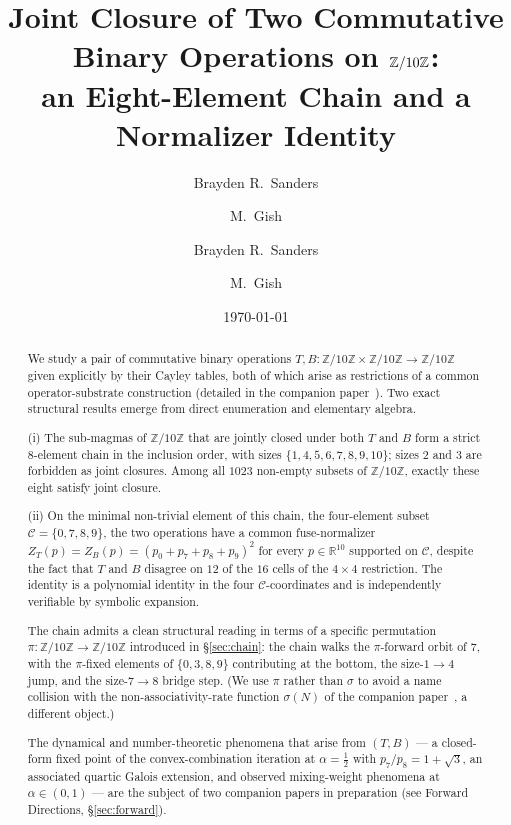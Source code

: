 \documentclass[11pt,reqno]{amsart}
\title[Joint closure on $\Zten$]{Joint Closure of Two Commutative Binary
Operations on $\Zten$:\\ an Eight-Element Chain and a Normalizer Identity}
\author{Brayden R.\ Sanders \and M.\ Gish}
\author{Brayden R.\ Sanders \and M.\ Gish}
\date{\today}
\theoremstyle{plain}
\theoremstyle{definition}
\theoremstyle{remark}
\newcommand{\Z}{\mathbb{Z}}
\newcommand{\R}{\mathbb{R}}
\newcommand{\Zten}{\Z/10\Z}
\newcommand{\Cfour}{\mathcal{C}}
\begin{document}
\begin{abstract}
We study a pair of commutative binary operations
$T,B:\Zten\times\Zten\to\Zten$ given explicitly by their Cayley
tables, both of which arise as restrictions of a common
operator-substrate construction (detailed in the companion
paper~\cite{SandersGish2026Sigma}). Two exact structural results
emerge from direct enumeration and elementary algebra.

(i) The sub-magmas of $\Zten$ that are jointly closed under
both $T$ and $B$ form a strict $8$-element chain in the inclusion
order, with sizes $\{1, 4, 5, 6, 7, 8, 9, 10\}$; sizes $2$ and $3$
are forbidden as joint closures. Among all $1023$ non-empty
subsets of $\Zten$, exactly these eight satisfy joint closure.

(ii) On the minimal non-trivial element of this chain, the
four-element subset $\Cfour=\{0,7,8,9\}$, the two operations have
a common fuse-normalizer
$Z_{T}(p)=Z_{B}(p)=(p_{0}+p_{7}+p_{8}+p_{9})^{2}$ for every
$p\in\R^{10}$ supported on $\Cfour$, despite the fact that $T$
and $B$ disagree on $12$ of the $16$ cells of the $4\times 4$
restriction. The identity is a polynomial identity in the four
$\Cfour$-coordinates and is independently verifiable by symbolic
expansion.

The chain admits a clean structural reading in terms of a
specific permutation $\pi:\Zten\to\Zten$ introduced in
\S\ref{sec:chain}: the chain walks the $\pi$-forward orbit of
$7$, with the $\pi$-fixed elements of $\{0,3,8,9\}$ contributing
at the bottom, the size-$1\to 4$ jump, and the size-$7\to 8$
bridge step. (We use $\pi$ rather than $\sigma$ to avoid a name
collision with the non-associativity-rate function $\sigma(N)$
of the companion paper~\cite{SandersGish2026Sigma}, a different
object.)

The dynamical and number-theoretic phenomena that arise from
$(T,B)$ --- a closed-form fixed point of the convex-combination
iteration at $\alpha=\tfrac12$ with $p_{7}/p_{8}=1+\sqrt{3}$, an
associated quartic Galois extension, and observed
mixing-weight phenomena at $\alpha\in(0,1)$ --- are the subject
of two companion papers in preparation
(see Forward Directions, \S\ref{sec:forward}).
\end{abstract}

\maketitle

\end{document}

